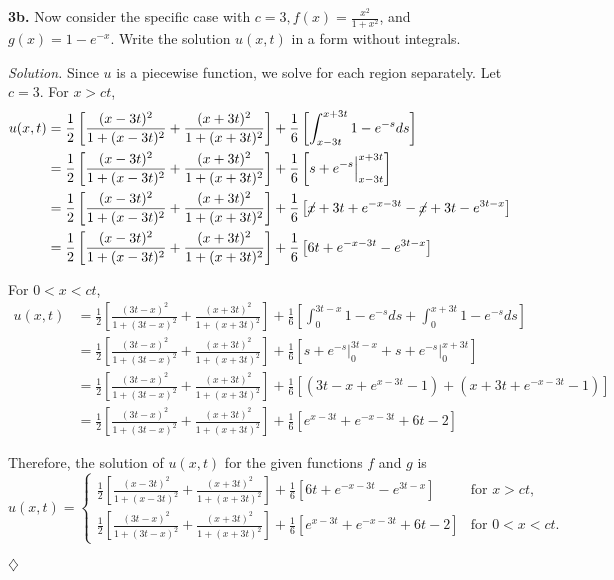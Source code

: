 \documentclass{article}
\begin{document}
\vspace{1mm}
\textbf{3b.} Now consider the specific case with \( c=3, f(x) = \frac{x^2}{1+x^2}\), and \(g(x)=1-e^{-x} \). Write the solution \(u(x,t)\) in a form without integrals. 

\vspace{3mm}
\textit{Solution.} Since \(u\) is a piecewise function, we solve for each region separately. Let \(c=3\). For \(x>ct\), 
\begin{align*}
u(x,t) &= \frac{1}{2} \left[ \frac{(x-3t)^2}{1+(x-3t)^2}+\frac{(x+3t)^2}{1+(x+3t)^2} \right] + \frac{1}{6} \left[ \int_{x-3t}^{x+3t} 1-e^{-s}ds \right]\\
&= \frac{1}{2} \left[ \frac{(x-3t)^2}{1+(x-3t)^2}+\frac{(x+3t)^2}{1+(x+3t)^2} \right] + \frac{1}{6} \left[ s + e^{-s} \Big|_{x-3t}^{x+3t} \right]\\
&= \frac{1}{2} \left[ \frac{(x-3t)^2}{1+(x-3t)^2}+\frac{(x+3t)^2}{1+(x+3t)^2} \right] + \frac{1}{6} \left[  \cancel x+3t+e^{-x-3t} - \cancel x+3t -e^{3t-x} \right] \\
&= \frac{1}{2} \left[ \frac{(x-3t)^2}{1+(x-3t)^2}+\frac{(x+3t)^2}{1+(x+3t)^2} \right] + \frac{1}{6} \left[ 6t+e^{-x-3t} -e^{3t-x} \right] 
\end{align*}

For \(0<x<ct\), 
\begin{align*}
u(x,t) &= \frac{1}{2} \left[ \frac{(3t-x)^2}{1+(3t-x)^2}+\frac{(x+3t)^2}{1+(x+3t)^2} \right] + \frac{1}{6} \left[ \int_{0}^{3t-x} 1-e^{-s}ds+ \int_{0}^{x+3t} 1-e^{-s}ds  \right]\\
&= \frac{1}{2} \left[ \frac{(3t-x)^2}{1+(3t-x)^2}+\frac{(x+3t)^2}{1+(x+3t)^2} \right] + \frac{1}{6} \left[ s + e^{-s} \Big|_{0}^{3t-x}+s + e^{-s} \Big|_{0}^{x+3t}  \right]\\
&= \frac{1}{2} \left[ \frac{(3t-x)^2}{1+(3t-x)^2}+\frac{(x+3t)^2}{1+(x+3t)^2} \right] + \frac{1}{6} \left[ (3t-x+ e^{x-3t}-1) + (x+3t + e^{-x-3t}-1)  \right]\\
&= \frac{1}{2} \left[ \frac{(3t-x)^2}{1+(3t-x)^2}+\frac{(x+3t)^2}{1+(x+3t)^2} \right] + \frac{1}{6} \left[ e^{x-3t}+e^{-x-3t} + 6t -2   \right]
\end{align*}

Therefore, the solution of \(u(x,t)\) for the given functions \(f\) and \(g\) is 
\[
 u(x,t)=
  \begin{cases}
                                  \frac{1}{2} \left[ \frac{(x-3t)^2}{1+(x-3t)^2}+\frac{(x+3t)^2}{1+(x+3t)^2} \right] + \frac{1}{6} \left[ 6t+e^{-x-3t} -e^{3t-x} \right]  & \text{for } x>ct, \\
                                   \frac{1}{2} \left[ \frac{(3t-x)^2}{1+(3t-x)^2}+\frac{(x+3t)^2}{1+(x+3t)^2} \right] + \frac{1}{6} \left[ e^{x-3t}+e^{-x-3t} + 6t -2   \right]& \text{for } 0<x<ct.
  \end{cases}   
\]
\begin{flushright}
\(\diamondsuit\)
\end{flushright}
\end{document}
